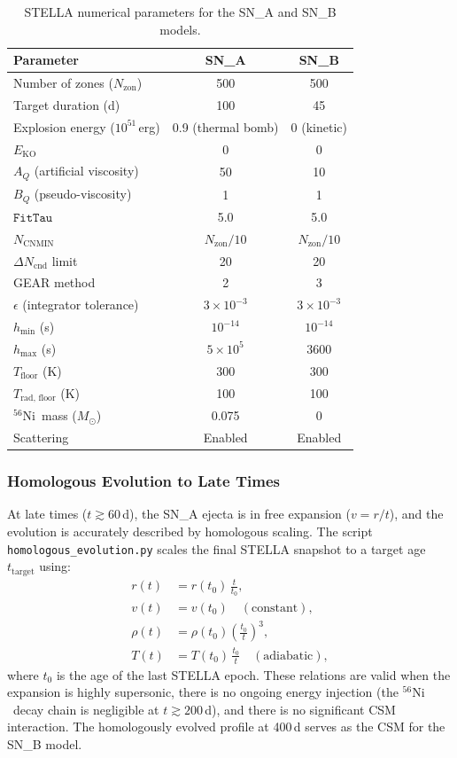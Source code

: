 \documentclass[11pt, a4paper]{article}
\newcommand{\Msun}{\ensuremath{M_\odot}}
\newcommand{\FitTau}{\ensuremath{\mathtt{FitTau}}}
\newcommand{\NCNMIN}{\ensuremath{N_{\mathrm{CNMIN}}}}
\newcommand{\EKO}{\ensuremath{E_{\mathrm{KO}}}}
\newcommand{\Ni}{\ensuremath{^{56}\mathrm{Ni}}}
\begin{document}
\begin{table}[ht]
\centering
\caption{STELLA numerical parameters for the SN\_A and SN\_B models.}
\label{tab:stella_params}
\begin{tabular}{lcc}
\toprule
Parameter & SN\_A & SN\_B \\
\midrule
Number of zones ($N_{\mathrm{zon}}$) & 500 & 500 \\
Target duration (d) & 100 & 45 \\
Explosion energy ($10^{51}$\,erg) & 0.9 (thermal bomb) & 0 (kinetic) \\
$\EKO$ & 0 & 0 \\
$A_Q$ (artificial viscosity) & 50 & 10 \\
$B_Q$ (pseudo-viscosity) & 1 & 1 \\
$\FitTau$ & 5.0 & 5.0 \\
$\NCNMIN$ & $N_{\mathrm{zon}}/10$ & $N_{\mathrm{zon}}/10$ \\
$\Delta N_{\mathrm{cnd}}$ limit & 20 & 20 \\
GEAR method & 2 & 3 \\
$\epsilon$ (integrator tolerance) & $3 \times 10^{-3}$ & $3 \times 10^{-3}$ \\
$h_{\min}$ (s) & $10^{-14}$ & $10^{-14}$ \\
$h_{\max}$ (s) & $5 \times 10^{5}$ & 3600 \\
$T_{\mathrm{floor}}$ (K) & 300 & 300 \\
$T_{\mathrm{rad,\,floor}}$ (K) & 100 & 100 \\
\Ni\ mass ($\Msun$) & 0.075 & 0 \\
Scattering & Enabled & Enabled \\
\bottomrule
\end{tabular}
\end{table}

\subsubsection{Homologous Evolution to Late Times}
\label{subsubsec:homologous}

At late times ($t \gtrsim 60$\,d), the SN\_A ejecta is in free expansion
($v = r/t$), and the evolution is accurately described by homologous
scaling.  The script \texttt{homologous\_evolution.py} scales the final
STELLA snapshot to a target age $t_{\mathrm{target}}$ using:
\begin{align}
    r(t) &= r(t_0) \, \frac{t}{t_0}, \\
    v(t) &= v(t_0) \quad (\text{constant}), \\
    \rho(t) &= \rho(t_0) \left(\frac{t_0}{t}\right)^3, \\
    T(t) &= T(t_0) \, \frac{t_0}{t} \quad (\text{adiabatic}),
\end{align}
where $t_0$ is the age of the last STELLA epoch.  These relations are valid
when the expansion is highly supersonic, there is no ongoing energy
injection (the \Ni\ decay chain is negligible at $t \gtrsim 200$\,d), and
there is no significant CSM interaction.  The homologously evolved profile
at 400\,d serves as the CSM for the SN\_B model.
\end{document}
